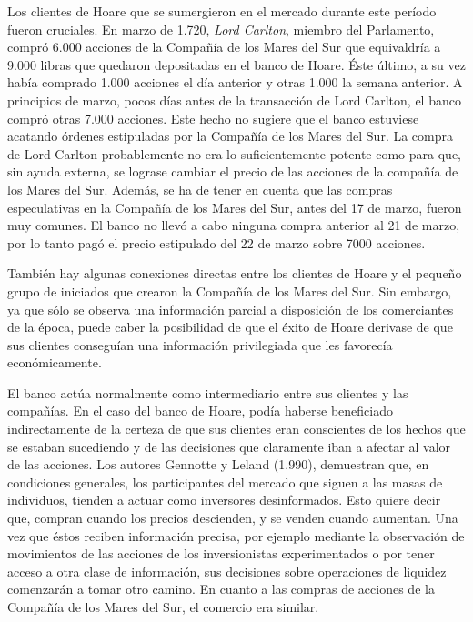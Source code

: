 Los clientes de Hoare que se sumergieron en el mercado durante este período fueron cruciales. En marzo de 1.720, \emph{Lord Carlton}, miembro del Parlamento, compró 6.000 acciones de la Compañía de los Mares del Sur que equivaldría a 9.000 libras que quedaron depositadas en el banco de Hoare. Éste último, a su vez había comprado 1.000 acciones el día anterior y otras 1.000 la semana anterior. A principios de marzo, pocos días antes de la transacción de Lord Carlton, el banco compró otras 7.000 acciones. Este hecho no sugiere que el banco estuviese acatando órdenes estipuladas por la Compañía de los Mares del Sur. La compra de Lord Carlton probablemente no era lo suficientemente potente como para que, sin ayuda externa, se lograse cambiar el precio de las acciones de la compañía de los Mares del Sur. Además, se ha de tener en cuenta que las compras especulativas en la Compañía de los Mares del Sur, antes del 17 de marzo, fueron muy comunes. El banco no llevó a cabo ninguna compra anterior al 21 de marzo, por lo tanto pagó el precio estipulado del 22 de marzo sobre 7000 acciones.

También hay algunas conexiones directas entre los clientes de Hoare y el pequeño grupo de iniciados que crearon la Compañía de los Mares del Sur. Sin embargo, ya que sólo se observa una información parcial a disposición de los comerciantes de la época, puede caber la posibilidad de que el éxito de Hoare derivase de que sus clientes conseguían una información privilegiada que les favorecía económicamente. 

El banco actúa normalmente como intermediario entre sus clientes y las compañías. En el caso del banco de Hoare, podía haberse beneficiado indirectamente de la certeza de que sus clientes eran conscientes de los hechos que se estaban sucediendo y de las decisiones que claramente iban a afectar al valor de las acciones. Los autores Gennotte y Leland (1.990), demuestran que, en condiciones generales, los participantes del mercado que siguen a las masas de individuos, tienden a actuar como inversores desinformados. Esto quiere decir que, compran cuando los precios descienden, y se venden cuando aumentan. Una vez que éstos reciben información precisa, por ejemplo mediante la observación de movimientos de las acciones de los inversionistas experimentados o por tener acceso a otra clase de información, sus decisiones sobre operaciones de liquidez comenzarán a tomar otro camino. En cuanto a las compras de acciones de la Compañía de los Mares del Sur, el comercio era similar. 

